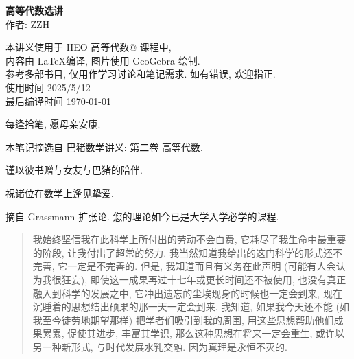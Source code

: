\documentclass[UTF8]{book}
\makeatletter
\newcommand{\Rmnum}[1]{\expandafter\@slowromancap\romannumeral #1@}
\makeatother
\begin{document}



\begin{titlepage}
    \vspace*{10em}
\begin{center}
    \textbf{\songti 高等代数选讲} \\ %
    \vspace{4em} %
    作者: ZZH \\ %
    \vspace{10em} %

    本讲义使用于 HEO 高等代数\Rmnum{2} 课程中, \\
    内容由 \LaTeX 编译, 图片使用 GeoGebra 绘制. \\
    参考多部书目, 仅用作学习讨论和笔记需求. 如有错误, 欢迎指正. \\
    使用时间 2025/5/12\\

    最后编译时间 \today\\
\end{center}

\end{titlepage} 

\newpage

\vspace*{5em}

每逢拾笔, 愿母亲安康. 

本笔记摘选自 巴猪数学讲义: 第二卷 高等代数. 

谨以彼书赠与女友与巴猪的陪伴. 

祝诸位在数学上逢见挚爱. 

\vspace*{5em}

摘自 Grassmann 扩张论. 您的理论如今已是大学入学必学的课程. 

\begin{quotation}
    \kaishu
    我始终坚信我在此科学上所付出的劳动不会白费, 它耗尽了我生命中最重要的阶段, 
    让我付出了超常的努力. 我当然知道我给出的这门科学的形式还不完善, 
    它一定是不完善的. 但是, 我知道而且有义务在此声明 (可能有人会认为我很狂妄), 
    即使这一成果再过十七年或更长时间还不被使用, 也没有真正融入到科学的发展之中, 
    它冲出遗忘的尘埃现身的时候也一定会到来, 现在沉睡着的思想结出硕果的那一天一定会到来. 
    我知道, 如果我今天还不能 (如我至今徒劳地期望那样) 把学者们吸引到我的周围, 
    用这些思想帮助他们成果累累, 促使其进步, 丰富其学识, 
    那么这种思想在将来一定会重生, 或许以另一种新形式, 与时代发展水乳交融. 
    因为真理是永恒不灭的. 
    \songti
\end{quotation}
\end{document}
